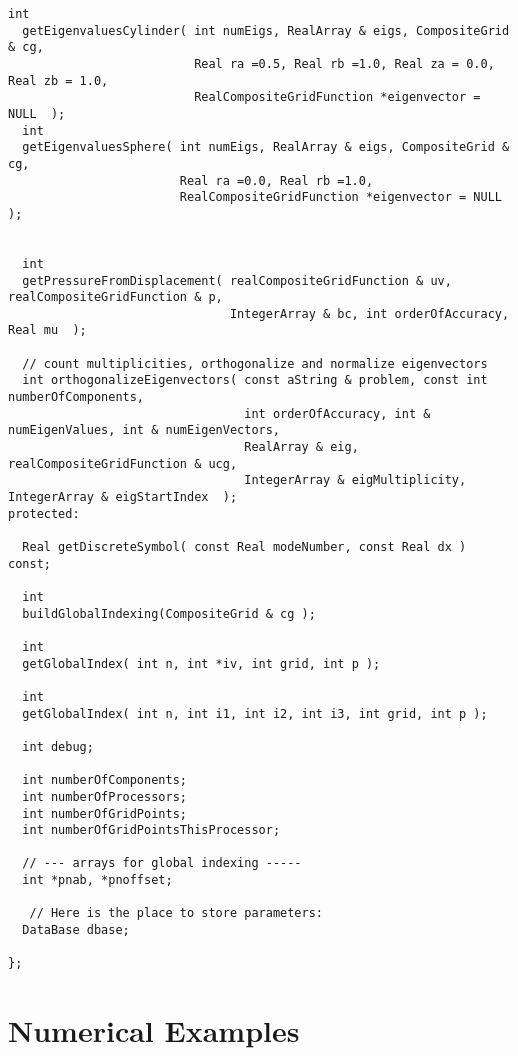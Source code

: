\documentclass[preprint,11pt]{elsarticle}
\begin{document}
\begin{Verbatim}[fontsize=\tiny]
  int 
  getEigenvaluesCylinder( int numEigs, RealArray & eigs, CompositeGrid & cg, 
                          Real ra =0.5, Real rb =1.0, Real za = 0.0, Real zb = 1.0,
                          RealCompositeGridFunction *eigenvector = NULL  );
  int 
  getEigenvaluesSphere( int numEigs, RealArray & eigs, CompositeGrid & cg, 
                        Real ra =0.0, Real rb =1.0, 
                        RealCompositeGridFunction *eigenvector = NULL  );


  int 
  getPressureFromDisplacement( realCompositeGridFunction & uv, realCompositeGridFunction & p, 
                               IntegerArray & bc, int orderOfAccuracy, Real mu  );                          

  // count multiplicities, orthogonalize and normalize eigenvectors
  int orthogonalizeEigenvectors( const aString & problem, const int numberOfComponents,
                                 int orderOfAccuracy, int & numEigenValues, int & numEigenVectors, 
                                 RealArray & eig, realCompositeGridFunction & ucg, 
                                 IntegerArray & eigMultiplicity, IntegerArray & eigStartIndex  );
protected:

  Real getDiscreteSymbol( const Real modeNumber, const Real dx ) const;

  int
  buildGlobalIndexing(CompositeGrid & cg );
  
  int 
  getGlobalIndex( int n, int *iv, int grid, int p );

  int 
  getGlobalIndex( int n, int i1, int i2, int i3, int grid, int p );

  int debug;

  int numberOfComponents;
  int numberOfProcessors;
  int numberOfGridPoints;
  int numberOfGridPointsThisProcessor;

  // --- arrays for global indexing -----
  int *pnab, *pnoffset;

   // Here is the place to store parameters:
  DataBase dbase;

};
\end{Verbatim}

\clearpage
\section{Numerical Examples}  \label{sec:numericalExamples}
\end{document}
